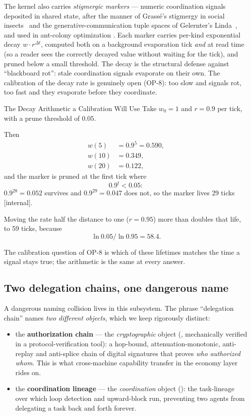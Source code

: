 \documentclass[11pt,a4paper]{article}
\theoremstyle{definition}
\theoremstyle{remark}
\begin{document}
The kernel also carries \emph{stigmergic markers} --- numeric coordination signals
deposited in shared state, after the manner of Grass\'e's stigmergy in social
insects~ and the generative-communication tuple spaces of
Gelernter's Linda~, and used in ant-colony optimization
. Each marker carries per-kind exponential decay $w \cdot
r^{\Delta t}$, computed both on a background evaporation tick \emph{and} at read
time (so a reader sees the correctly decayed value without waiting for the tick),
and pruned below a small threshold. The decay is the structural defense against
``blackboard rot'': stale coordination signals evaporate on their own. The
calibration of the decay rate is genuinely open (OP-8): too slow and signals rot,
too fast and they evaporate before they coordinate.

\begin{pdexample}{The Decay Arithmetic a Calibration Will Use}
\setlength{\parskip}{4pt plus 1pt}
Take $w_0=1$ and $r=0.9$ per tick, with a prune threshold of $0.05$.

Then
\[
\begin{aligned}
w(5)&=0.9^{5}=0.590,\\
w(10)&=0.349,\\
w(20)&=0.122,
\end{aligned}
\]
and the marker is pruned at
the first tick where
\[
0.9^{t}<0.05:
\]
$0.9^{28}=0.052$ survives and
$0.9^{29}=0.047$ does not, so the marker lives 29 ticks [internal].

Moving the
rate half the distance to one ($r=0.95$) more than doubles that life, to 59
ticks, because
\[
\ln 0.05/\ln 0.95=58.4.
\]

The calibration question of OP-8 is
which of these lifetimes matches the time a signal stays true; the arithmetic is
the same at every answer.
\end{pdexample}




\subsection{Two delegation chains, one dangerous name}

A dangerous naming collision lives in this subsystem. The phrase ``delegation chain''
names \emph{two different objects}, which we keep rigorously distinct:

\begin{itemize}[leftmargin=1.4em]
  \item the \textbf{authorization chain} --- the \emph{cryptographic} object
  (\Built, mechanically verified in a protocol-verification tool): a hop-bound,
  attenuation-monotonic, anti-replay and anti-splice chain of digital signatures
  that proves \emph{who authorized whom}. This is what cross-machine capability
  transfer in the economy layer rides on.
  \item the \textbf{coordination lineage} --- the \emph{coordination} object
  (\Designed): the task-lineage over which loop detection and upward-block run,
  preventing two agents from delegating a task back and forth forever.
\end{itemize}
\end{document}
